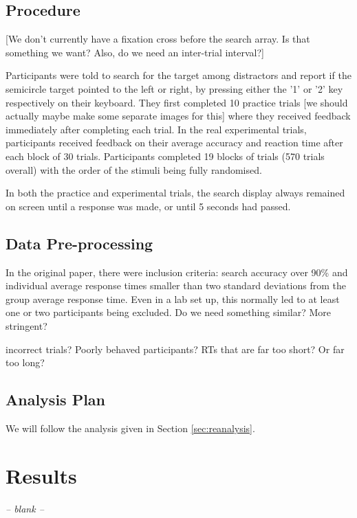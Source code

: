 \documentclass[smallextended, natbib]{svjour3}       %
\begin{document}
\subsection{Procedure}

[We don't currently have a fixation cross before the search array. Is that something we want? Also, do we need an inter-trial interval?]

Participants were told to search for the target among distractors and report if the semicircle target pointed to the left or right, by pressing either the '1' or '2' key respectively on their keyboard. They first completed 10 practice trials [we should actually maybe make some separate images for this] where they received feedback immediately after completing each trial. In the real experimental trials, participants received feedback on their average accuracy and reaction time after each block of 30 trials. Participants  completed 19 blocks of trials (570 trials overall) with the order of the stimuli being fully randomised.
 
In both the practice and experimental trials, the search display always remained on screen until a response was made, or until 5 seconds had passed. 

\subsection{Data Pre-processing}

In the original paper, there were inclusion criteria: search accuracy over 90\% and individual average response times smaller than two standard deviations from the group average response time. Even in a lab set up, this normally led to at least one or two participants being excluded. Do we need something similar? More stringent?


incorrect trials? Poorly behaved participants? RTs that are far too short? Or far too long?

\subsection{Analysis Plan}

We will follow the analysis given in Section \ref{sec:reanalysis}.


\section{Results}
\begin{center}
\textit{-- blank --}
\end{center}
\end{document}
